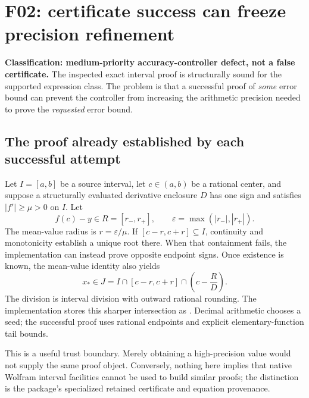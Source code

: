 \section{F02: certificate success can freeze precision refinement}\label{sec:f02}

\textbf{Classification: medium-priority accuracy-controller defect, not a false certificate.} The inspected exact interval proof is structurally sound for the supported expression class. The problem is that a successful proof of \emph{some} error bound can prevent the controller from increasing the arithmetic precision needed to prove the \emph{requested} error bound.


\subsection{The proof already established by each successful attempt}

Let $I=[a,b]$ be a source interval, let $c\in(a,b)$ be a rational center, and suppose a structurally evaluated derivative enclosure $D$ has one sign and satisfies $|f'|\ge\mu>0$ on $I$. Let
\[
 f(c)-y\in R=[r_-,r_+],\qquad \varepsilon=\max(|r_-|,|r_+|).
\]
The mean-value radius is $r=\varepsilon/\mu$. If $[c-r,c+r]\subseteq I$, continuity and monotonicity establish a unique root there. When that containment fails, the implementation can instead prove opposite endpoint signs. Once existence is known, the mean-value identity also yields
\begin{equation}\label{eq:sharp-interval}
 x_*\in J=I\cap[c-r,c+r]\cap\left(c-\frac{R}{D}\right).
\end{equation}
The division is interval division with outward rational rounding. The implementation stores this sharper intersection as . Decimal arithmetic chooses a seed; the successful proof uses rational endpoints and explicit elementary-function tail bounds.\cite{cert}

This is a useful trust boundary. Merely obtaining a high-precision  value would not supply the same proof object. Conversely, nothing here implies that native Wolfram interval facilities cannot be used to build similar proofs; the distinction is the package's specialized retained certificate and equation provenance.\cite{wl-interval,cert}

